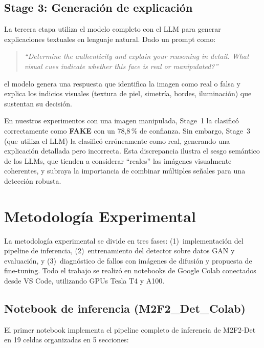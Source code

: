 \documentclass[pdflatex,sn-mathphys-num]{sn-jnl}
\begin{document}
\subsection{Stage 3: Generación de explicación}\label{subsec:stage3}

La tercera etapa utiliza el modelo completo con el LLM para generar explicaciones textuales en lenguaje natural. Dado un prompt como:

\begin{quote}
\emph{``Determine the authenticity and explain your reasoning in detail. What visual cues indicate whether this face is real or manipulated?''}
\end{quote}

el modelo genera una respuesta que identifica la imagen como real o falsa y explica los indicios visuales (textura de piel, simetría, bordes, iluminación) que sustentan su decisión.

En nuestros experimentos con una imagen manipulada, Stage~1 la clasificó correctamente como \textbf{FAKE} con un 78,8\,\% de confianza. Sin embargo, Stage~3 (que utiliza el LLM) la clasificó erróneamente como real, generando una explicación detallada pero incorrecta. Esta discrepancia ilustra el sesgo semántico de los LLMs, que tienden a considerar ``reales'' las imágenes visualmente coherentes, y subraya la importancia de combinar múltiples señales para una detección robusta.


\section{Metodología Experimental}\label{sec:methodology}

La metodología experimental se divide en tres fases: (1)~implementación del pipeline de inferencia, (2)~entrenamiento del detector sobre datos GAN y evaluación, y (3)~diagnóstico de fallos con imágenes de difusión y propuesta de fine-tuning. Todo el trabajo se realizó en notebooks de Google Colab conectados desde VS Code, utilizando GPUs Tesla T4 y A100.

\subsection{Notebook de inferencia (M2F2\_Det\_Colab)}\label{subsec:colab}

El primer notebook implementa el pipeline completo de inferencia de M2F2-Det en 19 celdas organizadas en 5 secciones:
\end{document}
